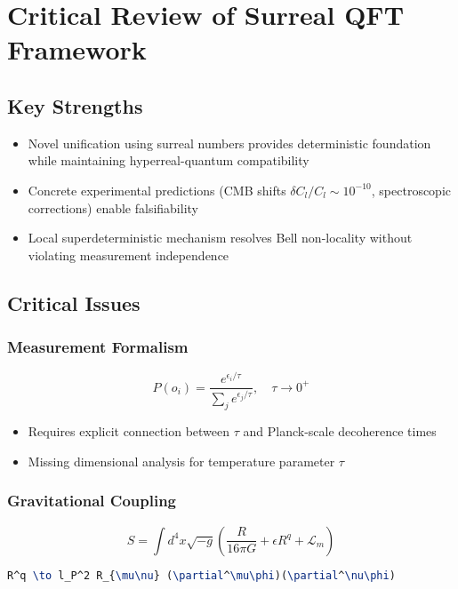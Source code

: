 \documentclass[12pt]{article}
\begin{document}
\section*{Critical Review of Surreal QFT Framework}

\subsection*{Key Strengths}
\begin{itemize}
\item Novel unification using surreal numbers provides deterministic foundation while maintaining hyperreal-quantum compatibility
\item Concrete experimental predictions (CMB shifts $\delta C_l/C_l \sim 10^{-10}$, spectroscopic corrections) enable falsifiability
\item Local superdeterministic mechanism resolves Bell non-locality without violating measurement independence
\end{itemize}

\subsection*{Critical Issues}
\subsubsection*{Measurement Formalism}
\begin{equation}
P(o_i) = \frac{e^{\epsilon_i/\tau}}{\sum_j e^{\epsilon_j/\tau}}, \quad \tau \to 0^+
\end{equation}
\begin{itemize}
\item Requires explicit connection between $\tau$ and Planck-scale decoherence times
\item Missing dimensional analysis for temperature parameter $\tau$
\end{itemize}

\subsubsection*{Gravitational Coupling}
\begin{equation}
S = \int d^4x \sqrt{-g} \left( \frac{R}{16\pi G} + \epsilon R^q + \mathcal{L}_m \right)
\end{equation}
\begin{lstlisting}[language=TeX]
% Original coupling term
R^q \to l_P^2 R_{\mu\nu} (\partial^\mu\phi)(\partial^\nu\phi)
\end{lstlisting}
\end{document}
